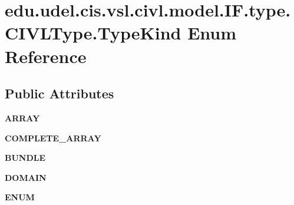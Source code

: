 \hypertarget{enumedu_1_1udel_1_1cis_1_1vsl_1_1civl_1_1model_1_1IF_1_1type_1_1CIVLType_1_1TypeKind}{}\section{edu.\+udel.\+cis.\+vsl.\+civl.\+model.\+I\+F.\+type.\+C\+I\+V\+L\+Type.\+Type\+Kind Enum Reference}
\label{enumedu_1_1udel_1_1cis_1_1vsl_1_1civl_1_1model_1_1IF_1_1type_1_1CIVLType_1_1TypeKind}
\subsection*{Public Attributes}
\begin{DoxyCompactItemize}
\item 
\hypertarget{enumedu_1_1udel_1_1cis_1_1vsl_1_1civl_1_1model_1_1IF_1_1type_1_1CIVLType_1_1TypeKind_a38a9e295101ecd2b7841aba13359c6b7}{}{\bfseries A\+R\+R\+A\+Y}\label{enumedu_1_1udel_1_1cis_1_1vsl_1_1civl_1_1model_1_1IF_1_1type_1_1CIVLType_1_1TypeKind_a38a9e295101ecd2b7841aba13359c6b7}

\item 
\hypertarget{enumedu_1_1udel_1_1cis_1_1vsl_1_1civl_1_1model_1_1IF_1_1type_1_1CIVLType_1_1TypeKind_a0cd7ccc41d3df349da31be3f27f98aa5}{}{\bfseries C\+O\+M\+P\+L\+E\+T\+E\+\_\+\+A\+R\+R\+A\+Y}\label{enumedu_1_1udel_1_1cis_1_1vsl_1_1civl_1_1model_1_1IF_1_1type_1_1CIVLType_1_1TypeKind_a0cd7ccc41d3df349da31be3f27f98aa5}

\item 
\hypertarget{enumedu_1_1udel_1_1cis_1_1vsl_1_1civl_1_1model_1_1IF_1_1type_1_1CIVLType_1_1TypeKind_aa1221c8e7c87639ee3099762c466c8d9}{}{\bfseries B\+U\+N\+D\+L\+E}\label{enumedu_1_1udel_1_1cis_1_1vsl_1_1civl_1_1model_1_1IF_1_1type_1_1CIVLType_1_1TypeKind_aa1221c8e7c87639ee3099762c466c8d9}

\item 
\hypertarget{enumedu_1_1udel_1_1cis_1_1vsl_1_1civl_1_1model_1_1IF_1_1type_1_1CIVLType_1_1TypeKind_a275ec29809c6558718cf383ce5c1a26b}{}{\bfseries D\+O\+M\+A\+I\+N}\label{enumedu_1_1udel_1_1cis_1_1vsl_1_1civl_1_1model_1_1IF_1_1type_1_1CIVLType_1_1TypeKind_a275ec29809c6558718cf383ce5c1a26b}

\item 
\hypertarget{enumedu_1_1udel_1_1cis_1_1vsl_1_1civl_1_1model_1_1IF_1_1type_1_1CIVLType_1_1TypeKind_aa1d588e290289646b00ecc0416e35d02}{}{\bfseries E\+N\+U\+M}\label{enumedu_1_1udel_1_1cis_1_1vsl_1_1civl_1_1model_1_1IF_1_1type_1_1CIVLType_1_1TypeKind_aa1d588e290289646b00ecc0416e35d02}


\end{DoxyCompactItemize}
